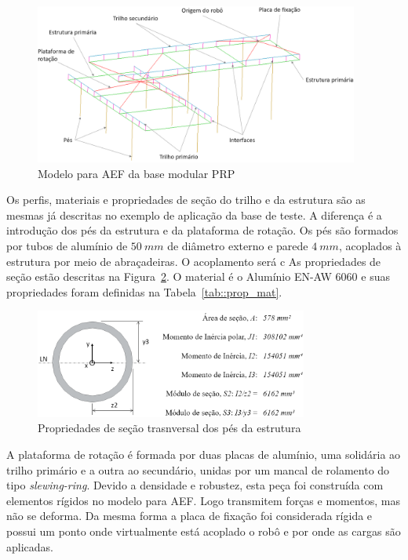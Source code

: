 \begin{figure}[h]
	\centering 
 	\includegraphics[width=0.95\textwidth]{figs/prp_fea}
 	\caption{Modelo para AEF da base modular PRP}
 	\label{fig::prp_fea}
\end{figure}

Os perfis, materiais e propriedades de seção do trilho e da estrutura são as
mesmas já descritas no exemplo de aplicação da base de teste. A diferença é a
introdução dos pés da estrutura e da plataforma de rotação. Os pés são formados
por tubos de alumínio de $50~mm$ de diâmetro externo e parede $4~mm$, acoplados
à estrutura por meio de abraçadeiras. O acoplamento será c
As propriedades de seção estão descritas na Figura~\ref{fig::sectrans_pes}. O
material é o Alumínio EN-AW 6060 e suas propriedades foram definidas na
Tabela~\ref{tab::prop_mat}.

\begin{figure}[h]
	\centering 
 	\includegraphics[width=0.80\textwidth]{figs/sectrans_pes}
 	\caption{Propriedades de seção trasnversal dos pés da estrutura}
 	\label{fig::sectrans_pes}
\end{figure}

A plataforma de rotação é formada por duas placas de alumínio, uma solidária ao
trilho primário e a outra ao secundário, unidas por um mancal de rolamento do
tipo \textit{slewing-ring}. Devido a densidade e robustez, esta peça foi
construída com elementos rígidos no modelo para AEF. Logo transmitem forças e
momentos, mas não se deforma. Da mesma forma a placa de fixação foi considerada
rígida e possui um ponto onde virtualmente está acoplado o robô e por onde as
cargas são aplicadas.

